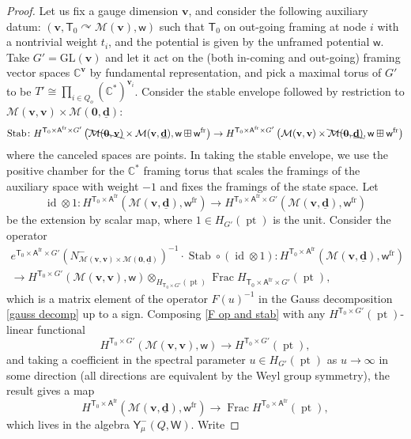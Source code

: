 \documentclass[10pt]{amsart}
\theoremstyle{definition}
\numberwithin{equation}{section}
\newcommand{\GL}{\mathrm{GL}}
\newcommand{\bC}{\mathbb{C}}
\newcommand{\bv}{\mathbf{v}}
\newcommand{\bd}{\mathbf{d}}
\newcommand{\cM}{\mathcal{M}}
\newcommand{\sA}{\mathsf{A}}
\newcommand{\sT}{\mathsf{T}}
\newcommand{\sW}{\mathsf{W}}
\newcommand{\sw}{\mathsf{w}}
\newcommand{\Frac}{\operatorname{Frac}}
\newcommand{\pt}{\operatorname{pt}}
\newcommand{\Stab}{\operatorname{Stab}}
\newcommand{\id}{\operatorname{id}}
\begin{document}
\begin{proof}
Let us fix a gauge dimension $\bv$, and consider the following auxiliary datum: $(\bv,\sT_0\curvearrowright\cM(\bv),\sw)$ such that $\sT_0$ on out-going framing at node $i$ with a nontrivial weight $t_i$, and the potential is given by the unframed potential $\sw$. Take $G'=\GL(\bv)$ and let it act on the (both in-coming and out-going) framing vector spaces $\bC^{\bv}$ by fundamental representation, and pick a maximal torus of $G'$ to be $T'\cong\prod_{i\in Q_o}(\bC^*)^{\bv_i}$. Consider the stable envelope followed by restriction to $\cM(\bv,\bv)\times \cM(\mathbf 0,\underline{\bd})$:
\begin{align*}
    \Stab\colon H^{\sT_0\times \sA^{\mathrm{fr}}\times G'}\left(\bcancel{\cM(\mathbf 0,\bv)}\times \cM(\bv,\underline{\bd}),\sw\boxplus \sw^{\mathrm{fr}}\right)\to H^{\sT_0\times \sA^{\mathrm{fr}}\times G'}\left(\cM(\bv,\bv)\times \bcancel{\cM(\mathbf 0,\underline{\bd})},\sw\boxplus \sw^{\mathrm{fr}}\right)
\end{align*}
where the canceled spaces are points. In taking the stable envelope, we use the positive chamber for the $\bC^*$ framing torus that scales the framings of the auxiliary space with weight $-1$ and fixes the framings of the state space. Let 
$$\id\otimes 1\colon H^{\sT_0\times \sA^{\mathrm{fr}}}\left( \cM(\bv,\underline{\bd}),\sw^{\mathrm{fr}}\right)\to H^{\sT_0\times \sA^{\mathrm{fr}}\times G'}\left( \cM(\bv,\underline{\bd}),\sw^{\mathrm{fr}}\right)$$ be the extension by scalar map, where $1\in H_{G'}(\pt)$ is the unit. Consider the operator 
\begin{equation}\label{F op and stab}
\begin{gathered}
e^{\sT_0\times \sA^{\mathrm{fr}}\times G'}\left(N^-_{\cM(\bv,\bv)\times\cM(\mathbf 0,\underline{\bd})}\right)^{-1}\cdot\Stab\circ (\id\otimes 1)\colon H^{\sT_0\times \sA^{\mathrm{fr}}}\left( \cM(\bv,\underline{\bd}),\sw^{\mathrm{fr}}\right)\\
\longrightarrow H^{\sT_0\times G'}\left(\cM(\bv,\bv),\sw\right)\otimes_{H_{\sT_0\times G'}(\pt)}\Frac H_{\sT_0\times \sA^{\mathrm{fr}}\times G'}(\pt),
\end{gathered}
\end{equation}
which is a matrix element of the operator $F(u)^{-1}$ in the Gauss decomposition \eqref{gauss decomp} up to a sign. Composing \eqref{F op and stab} with any $H^{\sT_0\times G'}\left(\pt\right)$-linear functional $$H^{\sT_0\times G'}\left(\cM(\bv,\bv),\sw\right)\to H^{\sT_0\times G'}\left(\pt\right),$$ and taking a coefficient in the spectral parameter $u\in H_{G'}(\pt)$ as $u\to \infty$ in some direction (all directions are equivalent by the Weyl group symmetry), the result gives a map $$H^{\sT_0\times \sA^{\mathrm{fr}}}\left( \cM(\bv,\underline{\bd}),\sw^{\mathrm{fr}}\right)\to \Frac H^{\sT_0\times \sA^{\mathrm{fr}}}\left(\pt\right),$$ which lives in the algebra $\mathsf Y^-_\mu(Q,\sW)$. Write 

\end{proof}
\end{document}
